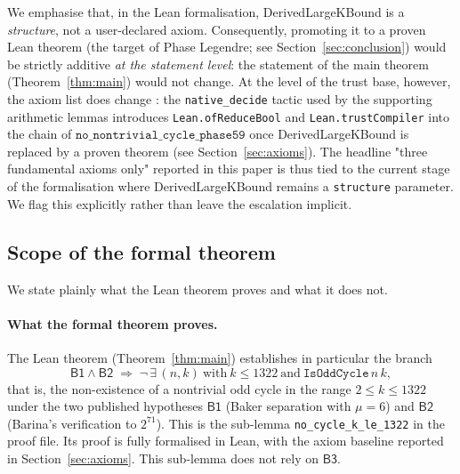\begin{remark}
We emphasise that, in the Lean formalisation,
\textsf{DerivedLargeKBound} is a \emph{structure}, not a user-declared
axiom. Consequently, promoting it to a proven Lean theorem (the target of
Phase Legendre; see Section~\ref{sec:conclusion}) would be strictly
additive \emph{at the statement level}: the statement of the main theorem
(Theorem~\ref{thm:main}) would not change. At the level of the trust
base, however, the axiom list does change : the \texttt{native\_decide}
tactic used by the supporting arithmetic lemmas introduces
\texttt{Lean.ofReduceBool} and \texttt{Lean.trustCompiler} into the chain
of \(\mathtt{no\_nontrivial\_cycle\_phase59}\) once
\textsf{DerivedLargeKBound} is replaced by a proven theorem
(see Section~\ref{sec:axioms}). The headline "three fundamental axioms
only" reported in this paper is thus tied to the current stage of the
formalisation where \textsf{DerivedLargeKBound} remains a \texttt{structure}
parameter. We flag this explicitly rather than leave the escalation
implicit.
\end{remark}

\subsection{Scope of the formal theorem}

We state plainly what the Lean theorem proves and what it does not.

\paragraph{What the formal theorem proves.}
The Lean theorem (Theorem~\ref{thm:main}) establishes in particular
the branch
\[
\mathsf{B1} \wedge \mathsf{B2}
\;\Longrightarrow\;
\neg\,\exists\,(n, k)\ \text{with}\ k \leq 1322\ \text{and}\ \texttt{IsOddCycle}\,n\,k,
\]
that is, the non-existence of a nontrivial odd cycle in the range
\(2 \leq k \leq 1322\) under the two published hypotheses
\(\mathsf{B1}\) (Baker separation with \(\mu = 6\)) and
\(\mathsf{B2}\) (Barina's verification to \(2^{71}\)). This is the
sub-lemma \texttt{no\_cycle\_k\_le\_1322} in the proof file. Its proof
is fully formalised in Lean, with the axiom baseline reported in
Section~\ref{sec:axioms}. This sub-lemma does not rely on \(\mathsf{B3}\).

